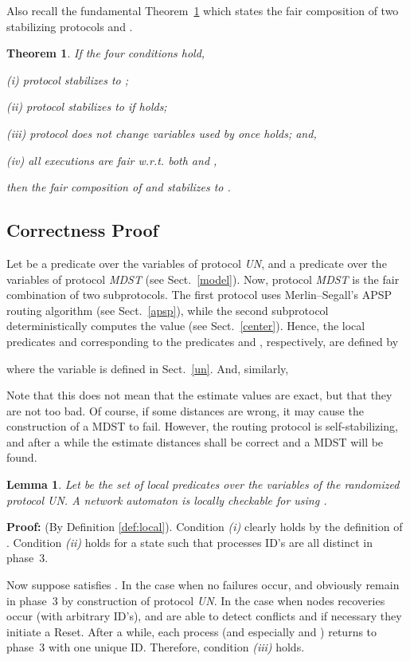 \documentclass[10pt]{article}
\newtheorem{thm}{Theorem}[section]
\newtheorem{lemm}{Lemma}[section]
\newenvironment{proof}{\begin{trivlist}
                       \item[]\hspace{0cm}\textbf{Proof: }
                       \hspace{0cm} }{\hfill 
                       \end{trivlist}}
\begin{document}
Also recall the fundamental Theorem~\ref{thm:comp} which states the
fair composition of two stabilizing protocols  and  \cite{DoIM93}.
\begin{thm}\label{thm:comp}
If the four conditions hold,

(i) protocol  stabilizes to ;

(ii) protocol  stabilizes to  if  holds;

(iii) protocol  does not change variables used by  once
 holds; and,

(iv) all executions are fair w.r.t. both  and ,

then the fair composition of  and  stabilizes to .
\end{thm}

\subsection{Correctness Proof}\label{correct}
Let  be a predicate over the variables of protocol {\em UN},
and  a predicate over the variables of protocol {\em MDST}
(see Sect.~\ref{model}). Now, protocol {\em MDST} is the fair combination
of two subprotocols. The first protocol uses Merlin--Segall's APSP routing
algorithm (see Sect.~\ref{apsp}),
while the second subprotocol deterministically
computes the value  (see Sect.~\ref{center}). Hence, the local
predicates  and  corresponding to the predicates
 and , respectively, are defined by

where the variable  is defined in Sect.~\ref{un}.
And, similarly,


Note that this does not mean that the estimate values  are exact,
but that they are not too bad. Of course, if some distances  are
wrong, it may cause the construction of a MDST to fail. However, the
routing protocol is self-stabilizing, and after a while the estimate
distances shall be correct and a MDST will be found.

\begin{lemm}\label{lem:l}
Let  be the set of local predicates over the
variables of the randomized protocol UN. A network automaton 
is locally checkable for  using .
\end{lemm}

\begin{proof}
(By Definition \ref{def:local}).
Condition {\em (i)} clearly holds by the definition of .
Condition {\em (ii)} holds for a state  such that
processes ID's are all distinct in phase~3.

Now suppose  satisfies . In the case when
no failures occur,  and  obviously remain in phase~3 by construction
of protocol {\em UN}. In the case when nodes recoveries occur (with
arbitrary ID's),  and  are able to detect conflicts and if
necessary they initiate a Reset. After a while, each process (and
especially  and ) returns to phase~3 with one unique ID.
Therefore, condition {\em (iii)} holds.
\end{proof}
\end{document}
